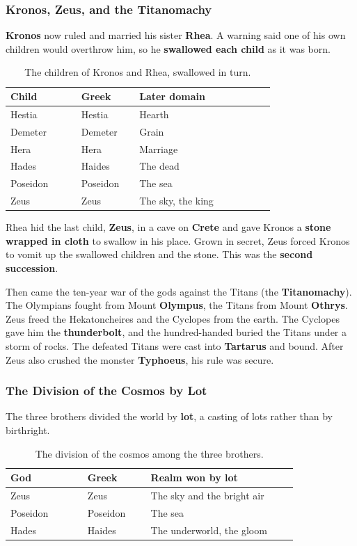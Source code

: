 \subsubsection{Kronos, Zeus, and the Titanomachy}

\textbf{Kronos} now ruled and married his sister \textbf{Rhea}. A warning said one
of his own children would overthrow him, so he \textbf{swallowed each child} as it
was born.

\begin{longtable}{L{0.22\linewidth} L{0.18\linewidth} L{0.42\linewidth}}
\caption{The children of Kronos and Rhea, swallowed in turn.}\\
\toprule
\textbf{Child} & \textbf{Greek} & \textbf{Later domain} \\
\midrule
Hestia & Hestia & Hearth \\
Demeter & Demeter & Grain \\
Hera & Hera & Marriage \\
Hades & Haides & The dead \\
Poseidon & Poseidon & The sea \\
Zeus & Zeus & The sky, the king \\
\bottomrule
\end{longtable}

Rhea hid the last child, \textbf{Zeus}, in a cave on \textbf{Crete} and gave
Kronos a \textbf{stone wrapped in cloth} to swallow in his place. Grown in secret,
Zeus forced Kronos to vomit up the swallowed children and the stone. This was the
\textbf{second succession}.

Then came the ten-year war of the gods against the
Titans (the \textbf{Titanomachy}). The Olympians fought from Mount \textbf{Olympus}, the Titans from Mount
\textbf{Othrys}. Zeus freed the Hekatoncheires and the Cyclopes from the earth.
The Cyclopes gave him the \textbf{thunderbolt}, and the hundred-handed buried the
Titans under a storm of rocks. The defeated Titans were cast into
\textbf{Tartarus} and bound. After Zeus also crushed the monster
\textbf{Typhoeus}, his rule was secure.

\subsubsection{The Division of the Cosmos by Lot}

The three brothers divided the world by \textbf{lot}, a casting of lots rather
than by birthright.

\begin{longtable}{L{0.22\linewidth} L{0.18\linewidth} L{0.42\linewidth}}
\caption{The division of the cosmos among the three brothers.}\\
\toprule
\textbf{God} & \textbf{Greek} & \textbf{Realm won by lot} \\
\midrule
Zeus & Zeus & The sky and the bright air \\
Poseidon & Poseidon & The sea \\
Hades & Haides & The underworld, the gloom \\
\bottomrule
\end{longtable}

